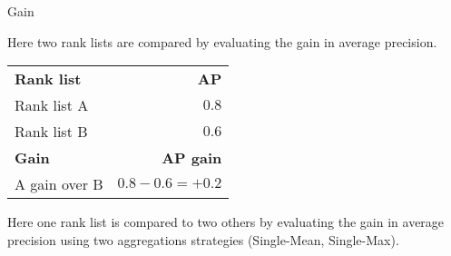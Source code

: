 \begin{example}[!t]
  \caption{Gain}
  \label{ex:gain}

  \begin{subexample}{\linewidth}
    Here two rank lists are compared by evaluating the gain in average precision.

    \vspace{0.2cm}

    \begin{center}
      \begin{tabular}{l r}
        \toprule
        \textbf{Rank list} & \textbf{AP} \\
        Rank list A & $0.8$ \\
        Rank list B & $0.6$ \\
        \midrule
        \textbf{Gain} & \textbf{AP gain} \\
        A gain over B & $0.8 - 0.6 = +0.2$ \\
        \bottomrule
      \end{tabular}
    \end{center}
  \end{subexample}

  \vspace{0.5cm}

  \begin{subexample}{\linewidth}

    Here one rank list is compared to two others by evaluating the gain in average precision using two aggregations strategies (Single-Mean, Single-Max).

    \vspace{0.2cm}

  \end{subexample}

\end{example}
